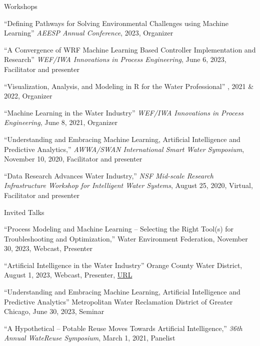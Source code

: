 \documentclass{resume} %
\begin{document}
\begin{rSection}{Workshops}

``Defining Pathways for Solving Environmental Challenges using Machine Learning'' \emph{AEESP Annual Conference}, 2023, Organizer

``A Convergence of WRF Machine Learning Based Controller Implementation and Research'' \emph{WEF/IWA Innovations in Process Engineering}, June 6, 2023, Facilitator and presenter

``Visualization, Analysis, and Modeling in R for the Water Professional'' , 2021 \& 2022, Organizer

``Machine Learning in the Water Industry'' \emph{WEF/IWA Innovations in Process Engineering}, June 8, 2021, Organizer

``Understanding and Embracing Machine Learning, Artificial Intelligence and Predictive Analytics,'' \emph{AWWA/SWAN International Smart Water Symposium}, November 10, 2020, Facilitator and presenter

``Data Research Advances Water Industry,'' \emph{NSF Mid-scale Research Infrastructure Workshop for Intelligent Water Systems}, August 25, 2020, Virtual, Facilitator and presenter

\end{rSection}





\begin{rSection}{Invited Talks}

``Process Modeling and Machine Learning – Selecting the Right Tool(s) for Troubleshooting and Optimization,'' Water Environment Federation, November 30, 2023, Webcast, Presenter

``Artificial Intelligence in the Water Industry'' Orange County Water District, August 1, 2023, Webcast, Presenter, \href{https://www.youtube.com/watch?v=M3AQTs5iN5g&list=PLUMrNJO9gBM-7WWzJmBveXSQWbOXrLBDg}{URL}

``Understanding and Embracing Machine Learning, Artificial Intelligence and Predictive Analytics'' Metropolitan Water Reclamation District of Greater Chicago, June 30, 2023, Seminar

``A Hypothetical – Potable Reuse Moves Towards Artificial Intelligence,'' \emph{36th Annual WateReuse Symposium}, March 1, 2021, Panelist

\end{rSection}
\end{document}
